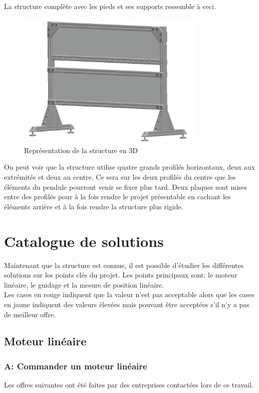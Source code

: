 La structure complète avec les pieds et ses supports ressemble à ceci.
\begin{figure}[H]
  \centering
  \includegraphics[width = 0.8\textwidth]{assets/figures/Structure.png}
  \caption{Représentation de la structure en 3D}
  \label{fig:DescStruct}
\end{figure}

On peut voir que la structure utilise quatre grands profilés horizontaux, deux aux extrémités et deux au centre. Ce sera sur les deux profilés du centre que
les éléments du pendule pourront venir se fixer plus tard. Deux plaques sont mises entre des profilés pour à la fois rendre le projet présentable
en cachant les éléments arrière et à la fois rendre la structure plus rigide.

\section{Catalogue de solutions}\label{sec:CatSol}
Maintenant que la structure est connue, il est possible d'étudier les différentes solutions sur les points clés du projet.
Les points principaux sont: le moteur linéaire, le guidage et la mesure de position linéaire.\\

Les cases en rouge indiquent que la valeur n'est pas acceptable alors que les cases en jaune indiquent des valeurs élevées mais pouvant être
acceptées s'il n'y a pas de meilleur offre.

\subsection{Moteur linéaire}
\subsubsection{A: Commander un moteur linéaire}
Les offres suivantes ont été faites par des entreprises contactées lors de ce travail.

